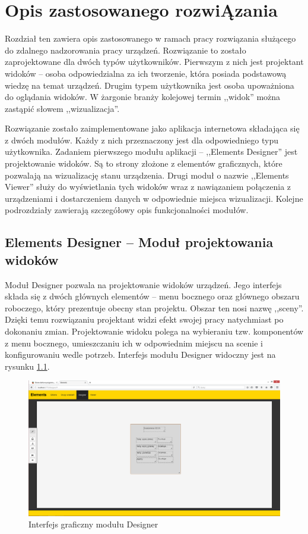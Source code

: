 \chapter[Opis zastosowanego rozwiązania]{Opis zastosowanego rozwi\k{A}zania}

Rozdział ten zawiera opis zastosowanego w ramach pracy rozwiązania służącego do zdalnego nadzorowania pracy urządzeń. Rozwiązanie to zostało zaprojektowane dla dwóch typów użytkowników. Pierwszym z nich jest projektant widoków – osoba odpowiedzialna za ich tworzenie, która posiada podstawową wiedzę na temat urządzeń. Drugim typem użytkownika jest osoba upoważniona do oglądania widoków. W żargonie branży kolejowej termin ,,widok'' można zastąpić słowem ,,wizualizacja''.

Rozwiązanie zostało zaimplementowane jako aplikacja internetowa składająca się z dwóch modułów. Każdy z nich przeznaczony jest dla odpowiedniego typu użytkownika. Zadaniem pierwszego modułu aplikacji -- ,,Elements Designer'' jest projektowanie widoków. Są to strony złożone z elementów graficznych, które pozwalają na wizualizację stanu urządzenia. Drugi moduł o nazwie ,,Elements Viewer'' służy do wyświetlania tych widoków wraz z nawiązaniem połączenia z urządzeniami i dostarczeniem danych w odpowiednie miejsca wizualizacji. Kolejne podrozdziały zawierają szczegółowy opis funkcjonalności modułów.

\section{Elements Designer -- Moduł projektowania widoków}

Moduł Designer pozwala na projektowanie widoków urządzeń. Jego interfejs składa się z dwóch głównych elementów – menu bocznego oraz głównego obszaru roboczego, który prezentuje obecny stan projektu. Obszar ten nosi nazwę ,,sceny''. Dzięki temu rozwiązaniu projektant widzi efekt swojej pracy natychmiast po dokonaniu zmian.
Projektowanie widoku polega na wybieraniu tzw. komponentów z menu bocznego, umieszczaniu ich w odpowiednim miejscu na scenie i konfigurowaniu wedle potrzeb. Interfejs modułu Designer widoczny jest na rysunku \ref{fig:designer_complete}.


\begin{figure}[h]
\centerline{
	\includegraphics[width=180mm]{./img/screen/designer_projektgotowy.png}
	}
	\caption{Interfejs graficzny modułu Designer}
	\label{fig:designer_complete}
\end{figure}

